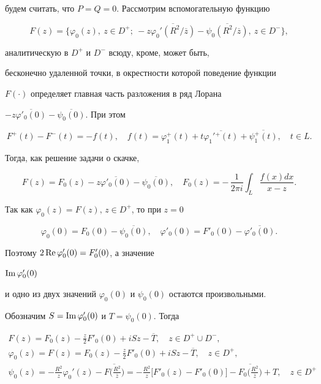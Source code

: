 будем считать, что $P=Q=0$. Рассмотрим вспомогательную функцию


$$


F(z) = \big\{ \varphi_0(z),\ z\in D^+;


\ -z\overline{\varphi_0'(R^2/\overline{z})}


-\overline{\psi_0(R^2/\overline{z})},\ z\in D^- \big\},


$$


аналитическую в $D^+$ и $D^-$ всюду, кроме, может быть,


бесконечно удаленной точки, в окрестности которой поведение функции


$F(\cdot)$ определяет главная часть разложения в ряд Лорана


$-z\overline{\varphi'_0(0)}-\overline{\psi_0(0)}$. При этом


$$


F^+(t)-F^-(t)=-f(t),\quad


f(t)=\varphi_1^+(t)+t\overline{\varphi_1'{}^+(t)}+\overline{\psi_1^+(t)},


\quad t\in L.


$$


Тогда, как решение задачи о скачке,


$$


F(z)=F_0(z)-z\overline{\varphi'_0(0)}-\overline{\psi_0(0)},\quad


F_0(z) = -\,\frac{1}{2\pi i}\int_{L}\frac{f(x)dx}{x-z}.


$$


Так как $\varphi_0(z)=F(z),\, z\in D^+$, то при $z=0$


$$


\varphi_0(0)=F_0(0)-\overline{\psi_0(0)},\quad


\varphi'_0(0)=F'_0(0)-\overline{\varphi'_0(0)}.


$$


Поэтому $2\operatorname{Re} \varphi'_0(0)=F'_0(0)$, а значение


$\operatorname{Im} \varphi'_0(0)$


и одно из двух значений $\varphi_0(0)$ и $\psi_0(0)$ остаются произвольными.


Обозначим $S=\operatorname{Im} \varphi'_0(0)$ и $T=\psi_0(0)$. Тогда


\begin{gather*}


F(z)=F_0(z)-\frac{z}{2}F'_0(0)+iSz-\overline{T},\quad z\in D^+\cup D^-, \\


%


\varphi_0(z)=F(z)=F_0(z)-\frac{z}{2}F'_0(0)+iSz-\overline{T},


\quad z\in D^+, \\


%


\psi_0(z)=-\frac{R^2}{z}\varphi_0'(z)


-\overline{F\bigg(\frac{R^2}{\overline{z}}\bigg)}


=-\frac{R^2}{z}\bigl[ F'_0(z)-F'_0(0)\bigl]


-\overline{F_0\bigg(\frac{R^2}{\overline{z}}\bigg)} +T,\quad z\in D^+


\end{gather*}


